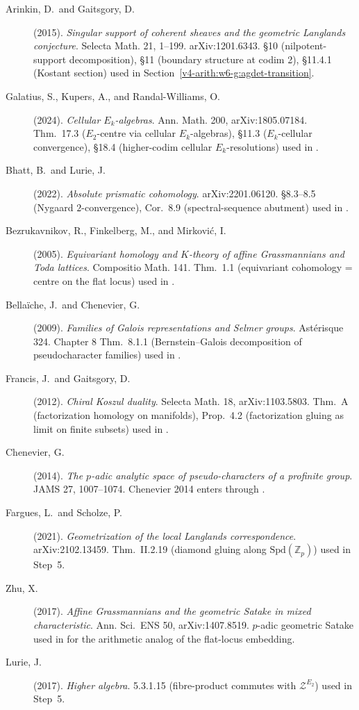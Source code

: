 \begin{description}
\item[Arinkin, D.\ and Gaitsgory, D.] (2015). \emph{Singular support
of coherent sheaves and the geometric Langlands conjecture}. Selecta
Math. 21, 1--199. arXiv:1201.6343. \S 10 (nilpotent-support
decomposition), \S 11 (boundary structure at codim 2), \S 11.4.1
(Kostant section) used in
Section~\ref{v4-arith:w6-g:agdet-transition}.
\item[Galatius, S., Kupers, A., and Randal-Williams, O.] (2024).
\emph{Cellular \(E_{k}\)-algebras}. Ann. Math. 200, arXiv:1805.07184.
Thm.~17.3 (\(E_{2}\)-centre via cellular \(E_{k}\)-algebras), \S 11.3
(\(E_{k}\)-cellular convergence), \S 18.4 (higher-codim cellular
\(E_{k}\)-resolutions) used in
.
\item[Bhatt, B.\ and Lurie, J.] (2022). \emph{Absolute prismatic
cohomology}. arXiv:2201.06120. \S 8.3--8.5 (Nygaard \(2\)-convergence),
Cor.~8.9 (spectral-sequence abutment) used in
.
\item[Bezrukavnikov, R., Finkelberg, M., and Mirkovi\'c, I.] (2005).
\emph{Equivariant homology and \(K\)-theory of affine Grassmannians and
Toda lattices}. Compositio Math. 141. Thm.~1.1
(equivariant cohomology = centre on the flat locus) used in
.
\item[Bella\"iche, J.\ and Chenevier, G.] (2009). \emph{Families of
Galois representations and Selmer groups}. Ast\'erisque 324.
Chapter 8 Thm.~8.1.1 (Bernstein--Galois decomposition of
pseudocharacter families) used in
.
\item[Francis, J.\ and Gaitsgory, D.] (2012). \emph{Chiral Koszul
duality}. Selecta Math. 18, arXiv:1103.5803. Thm.~A (factorization
homology on manifolds), Prop.~4.2 (factorization gluing as limit on
finite subsets) used in
.
\item[Chenevier, G.] (2014). \emph{The \(p\)-adic analytic space of
pseudo-characters of a profinite group}. JAMS 27, 1007--1074.
Chenevier 2014 enters through
.
\item[Fargues, L.\ and Scholze, P.] (2021). \emph{Geometrization of
the local Langlands correspondence}. arXiv:2102.13459. Thm.~II.2.19
(diamond gluing along \(\mathrm{Spd}(\mathbb{Z}_{p})\)) used in
 Step~5.
\item[Zhu, X.] (2017). \emph{Affine Grassmannians and the geometric
Satake in mixed characteristic}. Ann. Sci.\ ENS 50, arXiv:1407.8519.
\(p\)-adic geometric Satake used in
 for the arithmetic analog
of the flat-locus embedding.
\item[Lurie, J.] (2017). \emph{Higher algebra}. 5.3.1.15
(fibre-product commutes with \(\mathcal{Z}^{E_{2}}\)) used in
 Step~5.
\end{description}

